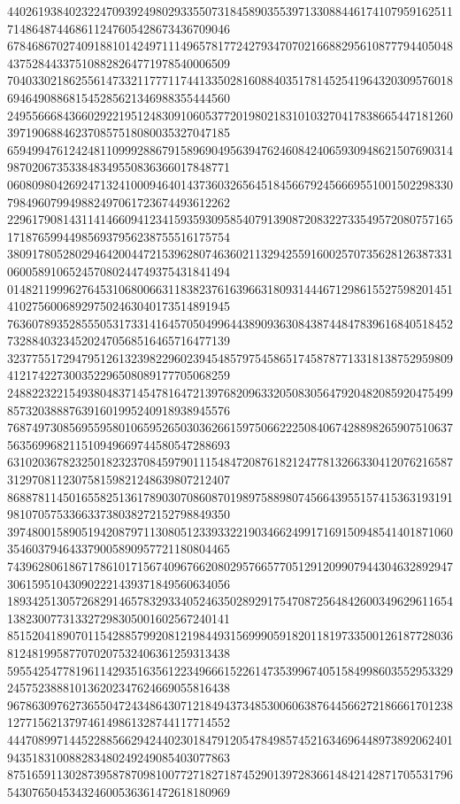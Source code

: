 \begin{DoxyCode}
      440261938402322470939249802933550731845890355397133088446174107959162511714864874468611247605428673436709046
      678468670274091881014249711149657817724279347070216688295610877794405048437528443375108828264771978540006509
      704033021862556147332117771174413350281608840351781452541964320309576018694649088681545285621346988355444560
      249556668436602922195124830910605377201980218310103270417838665447181260397190688462370857518080035327047185
      659499476124248110999288679158969049563947624608424065930948621507690314987020673533848349550836366017848771
      060809804269247132410009464014373603265645184566792456669551001502298330798496079949882497061723674493612262
      229617908143114146609412341593593095854079139087208322733549572080757165171876599449856937956238755516175754
      380917805280294642004472153962807463602113294255916002570735628126387331060058910652457080244749375431841494
      014821199962764531068006631183823761639663180931444671298615527598201451410275600689297502463040173514891945
      763607893528555053173314164570504996443890936308438744847839616840518452732884032345202470568516465716477139
      323775517294795126132398229602394548579754586517458787713318138752959809412174227300352296508089177705068259
      248822322154938048371454781647213976820963320508305647920482085920475499857320388876391601995240918938945576
      768749730856955958010659526503036266159750662225084067428898265907510637563569968211510949669744580547288693
      631020367823250182323708459790111548472087618212477813266330412076216587312970811230758159821248639807212407
      868878114501655825136178903070860870198975889807456643955157415363193191981070575336633738038272152798849350
      397480015890519420879711308051233933221903466249917169150948541401871060354603794643379005890957721180804465
      743962806186717861017156740967662080295766577051291209907944304632892947306159510430902221439371849560634056
      189342513057268291465783293340524635028929175470872564842600349629611654138230077313327298305001602567240141
      851520418907011542885799208121984493156999059182011819733500126187728036812481995877070207532406361259313438
      595542547781961142935163561223496661522614735399674051584998603552953329245752388810136202347624669055816438
      967863097627365504724348643071218494373485300606387644566272186661701238127715621379746149861328744117714552
      444708997144522885662942440230184791205478498574521634696448973892062401943518310088283480249249085403077863
      875165911302873958787098100772718271874529013972836614842142871705531796543076504534324600536361472618180969

\end{DoxyCode}
